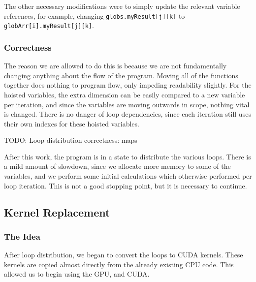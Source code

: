 \documentclass[12pt, oneside]{article}
\begin{document}
The other necessary modifications were to simply update the relevant variable references, for example, changing \texttt{globs.myResult[j][k]} to\\ \texttt{globArr[i].myResult[j][k]}.
\subsubsection{Correctness}
The reason we are allowed to do this is because we are not fundamentally changing anything about the flow of the program. Moving all of the functions together does nothing to program flow, only impeding readability slightly. For the hoisted variables, the extra dimension can be easily compared to a new variable per iteration, and since the variables are moving outwards in scope, nothing vital is changed. There is no danger of loop dependencies, since each iteration still uses their own indexes for these hoisted variables.

TODO: Loop distribution correctness: maps
			
After this work, the program is in a state to distribute the various loops. There is a mild amount of slowdown, since we allocate more memory to some of the variables, and we perform some initial calculations which otherwise performed per loop iteration. This is not a good stopping point, but it is necessary to continue.
\subsection{Kernel Replacement}
\subsubsection{The Idea}
After loop distribution, we began to convert the loops to CUDA kernels. These kernels are copied almost directly from the already existing CPU code. This allowed us to begin using the GPU, and CUDA.
\end{document}
